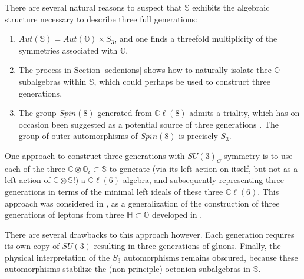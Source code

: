 \documentclass{article}
\newcommand{\bb}[1]{\mathbb{#1}}
\newcommand{\CCl}{\mathbb{C}\ell}
\begin{document}
There are several natural reasons to suspect that $\bb{S}$ exhibits the algebraic structure necessary to describe three full generations:
\begin{enumerate}
    \item $Aut(\bb{S})=Aut(\bb{O})\times S_3$, and one finds a threefold multiplicity of the symmetries associated with $\bb{O}$,
    \item The process in Section \ref{sedenions} shows how to naturally isolate thee $\bb{O}$ subalgebras within $\bb{S}$, which could perhaps be used to construct three generations, 
    \item The group $Spin(8)$ generated from $\CCl(8)$ admits a triality, which has on occasion been suggested as a potential source of three generations \cite{boyle2020standard2,masi2021exceptional}. The group of outer-automorphisms of $Spin(8)$ is precisely $S_3$.
\end{enumerate}


One approach to construct three generations with $SU(3)_C$ symmetry is to use each of the three $\bb{C}\otimes\bb{O}_i\subset \bb{S}$ to generate (via its left action on itself, but not as a left action of $\bb{C}\otimes\bb{S}$!) a $\bb{C}\ell(6)$ algebra, and subsequently representing three generations in terms of the minimal left ideals of these three $\bb{C}\ell(6)$. This approach was considered in \cite{gillard2019three}, as a generalization of the construction of three generations of leptons from three $\bb{H}\subset \bb{O}$ developed in \cite{manogue1999dimensional}. 

There are several drawbacks to this approach however.  Each generation requires its own copy of $SU(3)$ resulting in three generations of gluons. Finally, the physical interpretation of the $S_3$ automorphisms remains obscured, because these automorphisms stabilize the (non-principle) octonion subalgebras in $\bb{S}$. 
\end{document}
